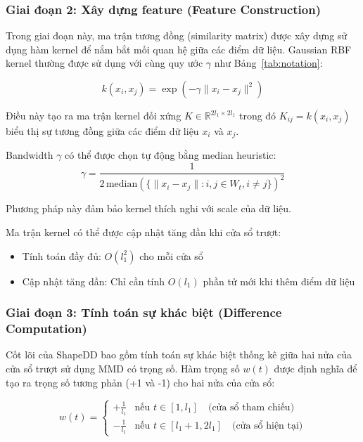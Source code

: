 \subsubsection{Giai đoạn 2: Xây dựng feature (Feature Construction)}

Trong giai đoạn này, ma trận tương đồng (similarity matrix) được xây dựng sử dụng hàm kernel để nắm bắt mối quan hệ giữa các điểm dữ liệu. Gaussian RBF kernel thường được sử dụng với cùng quy ước $\gamma$ như Bảng~\ref{tab:notation}:

\begin{equation}
	k(x_i, x_j) = \exp\left(-\gamma \|x_i - x_j\|^2\right)
\end{equation}

Điều này tạo ra ma trận kernel đối xứng $K \in \mathbb{R}^{2l_1 \times 2l_1}$ trong đó $K_{ij} = k(x_i, x_j)$ biểu thị sự tương đồng giữa các điểm dữ liệu $x_i$ và $x_j$.

Bandwidth $\gamma$ có thể được chọn tự động bằng median heuristic:
\begin{equation}
	\gamma = \frac{1}{2\,\text{median}\left(\{\|x_i - x_j\| : i, j \in W_t, i \neq j\}\right)^2}
\end{equation}

Phương pháp này đảm bảo kernel thích nghi với scale của dữ liệu.

Ma trận kernel có thể được cập nhật tăng dần khi cửa sổ trượt:
\begin{itemize}
	\item Tính toán đầy đủ: $O(l_1^2)$ cho mỗi cửa sổ
	\item Cập nhật tăng dần: Chỉ cần tính $O(l_1)$ phần tử mới khi thêm điểm dữ liệu
\end{itemize}

\subsubsection{Giai đoạn 3: Tính toán sự khác biệt (Difference Computation)}

Cốt lõi của ShapeDD bao gồm tính toán sự khác biệt thống kê giữa hai nửa của cửa sổ trượt sử dụng MMD có trọng số. Hàm trọng số $w(t)$ được định nghĩa để tạo ra trọng số tương phản (+1 và -1) cho hai nửa của cửa sổ:

\begin{equation}
	w(t) = \begin{cases}
		+\frac{1}{l_1} & \text{nếu } t \in [1, l_1] \quad \text{(cửa sổ tham chiếu)}    \\
		-\frac{1}{l_1} & \text{nếu } t \in [l_1+1, 2l_1] \quad \text{(cửa sổ hiện tại)}
	\end{cases}
\end{equation}

